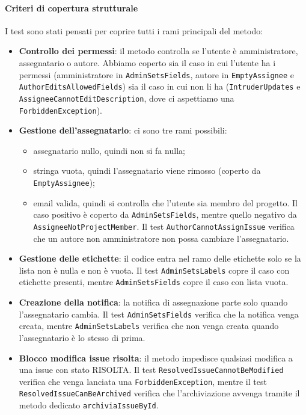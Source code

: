 \paragraph{Criteri di copertura strutturale}

I test sono stati pensati per coprire tutti i rami principali del metodo:

\begin{itemize}
    \item \textbf{Controllo dei permessi}: il metodo controlla se l'utente \`e amministratore, assegnatario o autore. Abbiamo coperto sia il caso in cui l'utente ha i permessi (amministratore in \texttt{AdminSetsFields}, autore in \texttt{EmptyAssignee} e \texttt{AuthorEditsAllowedFields}) sia il caso in cui non li ha (\texttt{IntruderUpdates} e \texttt{AssigneeCannotEditDescription}, dove ci aspettiamo una \texttt{ForbiddenException}).

    \item \textbf{Gestione dell'assegnatario}: ci sono tre rami possibili:
    \begin{itemize}
        \item assegnatario nullo, quindi non si fa nulla;
        \item stringa vuota, quindi l'assegnatario viene rimosso (coperto da \texttt{EmptyAssignee});
        \item email valida, quindi si controlla che l'utente sia membro del progetto. Il caso positivo \`e coperto da \texttt{AdminSetsFields}, mentre quello negativo da \texttt{AssigneeNotProjectMember}. Il test \texttt{AuthorCannotAssignIssue} verifica che un autore non amministratore non possa cambiare l'assegnatario.
    \end{itemize}

    \item \textbf{Gestione delle etichette}: il codice entra nel ramo delle etichette solo se la lista non \`e nulla e non \`e vuota. Il test \texttt{AdminSetsLabels} copre il caso con etichette presenti, mentre \texttt{AdminSetsFields} copre il caso con lista vuota.

    \item \textbf{Creazione della notifica}: la notifica di assegnazione parte solo quando l'assegnatario cambia. Il test \texttt{AdminSetsFields} verifica che la notifica venga creata, mentre \texttt{AdminSetsLabels} verifica che non venga creata quando l'assegnatario \`e lo stesso di prima.

    \item \textbf{Blocco modifica issue risolta}: il metodo impedisce qualsiasi modifica a una issue con stato RISOLTA. Il test \texttt{ResolvedIssueCannotBeModified} verifica che venga lanciata una \texttt{ForbiddenException}, mentre il test \texttt{ResolvedIssueCanBeArchived} verifica che l'archiviazione avvenga tramite il metodo dedicato \texttt{archiviaIssueById}.


\end{itemize}
